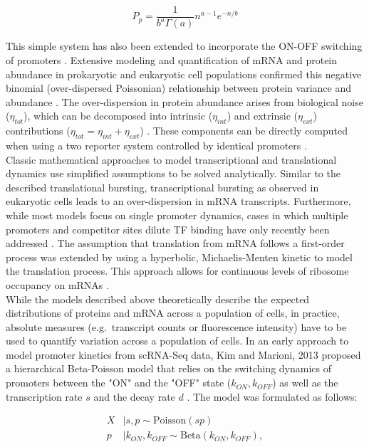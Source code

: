 \begin{equation}
P_p=\frac{1}{b^a\Gamma(a)}n^{a-1} e^{-n/b}
\end{equation}

\noindent This simple system has also been extended to incorporate the ON-OFF switching of promoters \citep{Jones2014, Shahrezaei2008}. Extensive modeling and quantification of mRNA and protein abundance in prokaryotic and eukaryotic cell populations confirmed this negative binomial (over-dispersed Poissonian) relationship between protein variance and abundance \citep{Ozbudak2002, Bar-Even2006}. The over-dispersion in protein abundance arises from biological noise ($\eta_{tot}$), which can be decomposed into intrinsic ($\eta_{int}$) and extrinsic ($\eta_{ext}$) contributions ($\eta_{tot}=\eta_{int}+\eta_{ext}$) \citep{Swain2002, Fu2016}. These components can be directly computed when using a two reporter system controlled by identical promoters \citep{Elowitz2002}. \\

Classic mathematical approaches to model transcriptional and translational dynamics use simplified assumptions to be solved analytically. Similar to the described translational bursting, transcriptional bursting as observed in eukaryotic cells \citep{Raj2006} leads to an over-dispersion in mRNA transcripts. Furthermore, while most models focus on single promoter dynamics, cases in which multiple promoters and competitor sites dilute TF binding have only recently been addressed \citep{Das2015a}. The assumption that translation from mRNA follows a first-order process was extended by using a hyperbolic, Michaelis-Menten kinetic to model the translation process. This approach allows for continuous levels of ribosome occupancy on mRNAs \citep{VanDyken2017}. \\ 

While the models described above theoretically describe the expected distributions of proteins and mRNA across a population of cells, in practice, absolute measures (e.g.~transcript counts or fluorescence intensity) have to be used to quantify variation across a population of cells. In an early approach to model promoter kinetics from \gls{scRNA-Seq} data, Kim and Marioni, 2013 proposed a hierarchical Beta-Poisson model that relies on the switching dynamics of promoters between the "ON" and the "OFF" state ($k_{ON},k_{OFF}$) as well as the transcription rate $s$ and the decay rate $d$ \citep{Kim2013}. The model was formulated as follows:

\begin{align*}
X&|s,p\sim{}\text{Poisson}(sp)\\
p&|k_{ON},k_{OFF}\sim{}\text{Beta}(k_{ON},k_{OFF}),
\end{align*}

